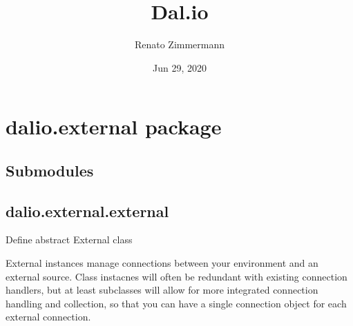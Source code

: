 \documentclass[letterpaper,10pt,english]{sphinxmanual}
\title{Dal.io}
\date{Jun 29, 2020}
\author{Renato Zimmermann}
\begin{document}
\pagestyle{empty}
\sphinxmaketitle
\pagestyle{plain}
\sphinxtableofcontents
\pagestyle{normal}
\label{\detokenize{index::doc}}



\chapter{dalio.external package}
\label{\detokenize{dalio.external:dalio-external-package}}\label{\detokenize{dalio.external::doc}}

\section{Submodules}
\label{\detokenize{dalio.external:submodules}}

\section{dalio.external.external}
\label{\detokenize{dalio.external:module-dalio.external.external}}\label{\detokenize{dalio.external:dalio-external-external}}
Define abstract External class

External instances manage connections between your environment and an
external source. Class instacnes will often be redundant with existing
connection handlers, but at least subclasses will allow for more integrated
connection handling and collection, so that you can have a single connection
object for each external connection.
\end{document}
